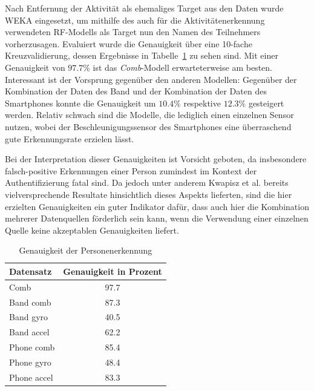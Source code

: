 Nach Entfernung der Aktivität als ehemaliges Target aus den Daten wurde WEKA eingesetzt, um mithilfe des auch für die Aktivitätenerkennung verwendeten RF-Modells als Target nun den Namen des Teilnehmers vorherzusagen. Evaluiert wurde die Genauigkeit über eine 10-fache Kreuzvalidierung, dessen Ergebnisse in Tabelle~\ref{tab:user-prediction-accuracy} zu sehen sind. Mit einer Genauigkeit von $97.7 \%$ ist das \textit{Comb}-Modell erwarteterweise am besten. Interessant ist der Vorsprung gegenüber den anderen Modellen: Gegenüber der Kombination der Daten des Band und der Kombination der Daten des Smartphones konnte die Genauigkeit um $10.4 \%$ respektive $12.3 \%$ gesteigert werden. Relativ schwach sind die Modelle, die lediglich einen einzelnen Sensor nutzen, wobei der Beschleunigungssensor des Smartphones eine überraschend gute Erkennungsrate erzielen lässt.

Bei der Interpretation dieser Genauigkeiten ist Vorsicht geboten, da insbesondere falsch-positive Erkennungen einer Person zumindest im Kontext der Authentifizierung fatal sind. Da jedoch unter anderem Kwapisz et al. bereits vielversprechende Resultate hinsichtlich dieses Aspekts lieferten, sind die hier erzielten Genauigkeiten ein guter Indikator dafür, dass auch hier die Kombination mehrerer Datenquellen förderlich sein kann, wenn die Verwendung einer einzelnen Quelle keine akzeptablen Genauigkeiten liefert.

\begin{table}
\centering
\begin{tabular}{|l|c|}
	\hline 
	\textbf{Datensatz} & \textbf{Genauigkeit in Prozent} \\ 
	\hline 
	Comb & 97.7 \\ 
	\hline
	Band comb & 87.3 \\ 
	\hline 
	Band gyro & 40.5 \\ 
	\hline 
	Band accel & 62.2 \\ 
	\hline 
	Phone comb & 85.4 \\ 
	\hline 
	Phone gyro & 48.4 \\ 
	\hline 
	Phone accel & 83.3 \\ 
	\hline 
\end{tabular} 
\caption{Genauigkeit der Personenerkennung}
\label{tab:user-prediction-accuracy}
\end{table}

